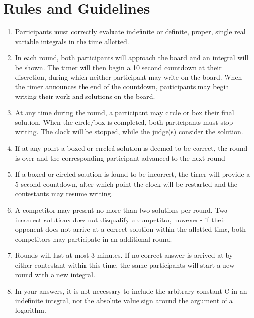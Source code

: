 \documentclass{article}
\begin{document}
\section{Rules and Guidelines}

\begin{enumerate}
    \item Participants must correctly evaluate indefinite or definite, proper, single real variable integrals in the time allotted.
    
    \item In each round, both participants will approach the board and an integral will be shown. The timer will then begin a 10 second countdown at their discretion, during which neither participant may write on the board. When the timer announces the end of the countdown, participants may begin writing their work and solutions on the board.
    
    \item At any time during the round, a participant may circle or box their final solution. When the circle/box is completed, both participants must stop writing. The clock will be stopped, while the judge(s) consider the solution.
    
    \item If at any point a boxed or circled solution is deemed to be correct, the round is over and the corresponding participant advanced to the next round.
    
    \item If a boxed or circled solution is found to be incorrect, the timer will provide a 5 second countdown, after which point the clock will be restarted and the contestants may resume writing.
    
    \item A competitor may present no more than two solutions per round. Two incorrect solutions does not disqualify a competitor, however - if their opponent does not arrive at a correct solution within the allotted time, both competitors may participate in an additional round.
    
    \item Rounds will last at most 3 minutes. If no correct answer is arrived at by either contestant within this time, the same participants will start a new round with a new integral.
    
    \item In your answers, it is not necessary to include the arbitrary constant C in an indefinite integral, nor the absolute value sign around the argument of a logarithm.
    
\end{enumerate}
\end{document}
